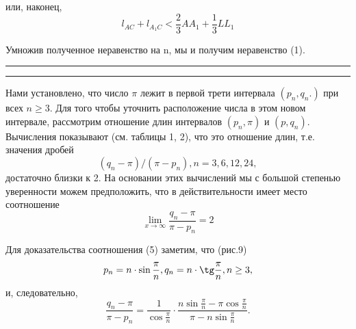 \setcounter{page}{7}

\pagestyle{fancy}
\fancyhf{}
\fancyhead[L]{\thepage}
\renewcommand{\headrulewidth}{0pt}


\vspace*{-3.5\baselineskip}
\begin{multicols}{3}
\noindent или, наконец, \[l_{AC}+l_{A_1C} < \frac{2}{3}AA_1 + \frac{1}{3}LL_1 \]

Умножив полученное неравенство на n, мы и получим неравенство (1). 
\vspace{8pt} \hrule \vspace{1pt} \noindent
\parbox{0.85\linewidth}{\large\bfseries{}}
\hrule \vspace{8pt}\noindent Нами установлено, что число \(\pi\) лежит в первой трети интервала \((p_n, q_n.)\) при всех \(n\geq 3\). Для того чтобы уточнить расположение числа в этом новом интервале, рассмотрим отношение длин интервалов \((p_n, \pi)\) и \((p, q_n)\). Вычисления показывают (см. таблицы 1, 2), что это отношение длин, т.е. значения дробей \[(q_n - \pi)/(\pi - p_n), n = 3, 6, 12, 24,\] достаточно близки к 2. На основании этих вычислений мы с большой степенью уверенности можем предположить, что в действительности имеет место соотношение 
\begin{equation}
    \lim\limits_{x \to \infty}\frac{q_n - \pi}{\pi - p_n} = 2
\end{equation} 

Для доказательства соотношения (5) заметим, что (рис.9) \[p_n  = n \cdot \sin\frac{\pi}{n}, q_n = n \cdot \tg\frac{\pi}{n}, n\geq3,\] и, следовательно,\[\frac{q_n - \pi}{\pi - p_n} = \frac{1}{\cos\frac{\pi}{n}} \cdot \frac{n\sin\frac{\pi}{n} - \pi\cos\frac{\pi}{n}}{\pi-n\sin\frac{\pi}{n}}.\]


\end{multicols}
